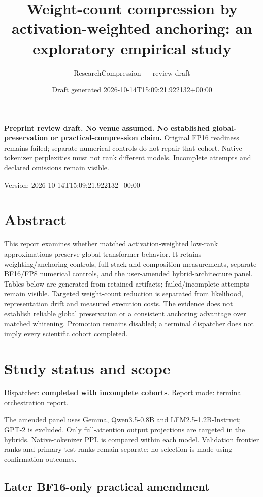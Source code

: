 \documentclass[10pt]{article}
\title{Weight-count compression by activation-weighted anchoring: an exploratory empirical study}
\author{ResearchCompression --- review draft}
\date{Draft generated 2026-10-14T15:09:21.922132+00:00}
\begin{document}
\maketitle
\noindent\textbf{Preprint review draft. No venue assumed. No established global-preservation or practical-compression claim.}
Original FP16 readiness remains failed; separate numerical controls do not repair that cohort. Native-tokenizer perplexities must not rank different models. Incomplete attempts and declared omissions remain visible.


Version: 2026-10-14T15:09:21.922132+00:00

\section{Abstract}

This report examines whether matched activation-weighted low-rank approximations preserve global transformer behavior. It retains weighting/anchoring controls, full-stack and composition measurements, separate BF16/FP8 numerical controls, and the user-amended hybrid-architecture panel. Tables below are generated from retained artifacts; failed/incomplete attempts remain visible. Targeted weight-count reduction is separated from likelihood, representation drift and measured execution costs. The evidence does not establish reliable global preservation or a consistent anchoring advantage over matched whitening. Promotion remains disabled; a terminal dispatcher does not imply every scientific cohort completed.

\section{Study status and scope}

Dispatcher: \textbf{completed with incomplete cohorts}. Report mode: terminal orchestration report.

The amended panel uses Gemma, Qwen3.5-0.8B and LFM2.5-1.2B-Instruct; GPT-2 is excluded. Only full-attention output projections are targeted in the hybrids. Native-tokenizer PPL is compared within each model. Validation frontier ranks and primary test ranks remain separate; no selection is made using confirmation outcomes.

\subsection{Later BF16-only practical amendment}
\end{document}
